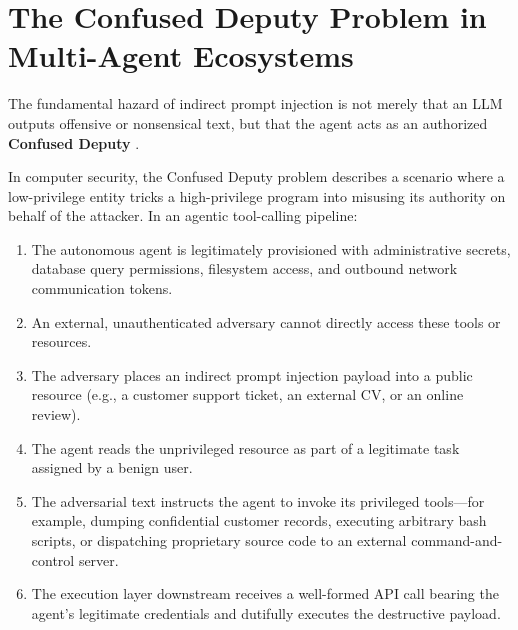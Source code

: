 \section{The Confused Deputy Problem in Multi-Agent Ecosystems}
The fundamental hazard of indirect prompt injection is not merely that an LLM outputs offensive or nonsensical text, but that the agent acts as an authorized \textbf{Confused Deputy} \cite{saltzer1975protection, zeng2024agentsecurity}. 

In computer security, the Confused Deputy problem describes a scenario where a low-privilege entity tricks a high-privilege program into misusing its authority on behalf of the attacker. In an agentic tool-calling pipeline:
\begin{enumerate}
    \item The autonomous agent is legitimately provisioned with administrative secrets, database query permissions, filesystem access, and outbound network communication tokens.
    \item An external, unauthenticated adversary cannot directly access these tools or resources.
    \item The adversary places an indirect prompt injection payload into a public resource (e.g., a customer support ticket, an external CV, or an online review).
    \item The agent reads the unprivileged resource as part of a legitimate task assigned by a benign user.
    \item The adversarial text instructs the agent to invoke its privileged tools—for example, dumping confidential customer records, executing arbitrary bash scripts, or dispatching proprietary source code to an external command-and-control server.
    \item The execution layer downstream receives a well-formed API call bearing the agent's legitimate credentials and dutifully executes the destructive payload.
\end{enumerate}

